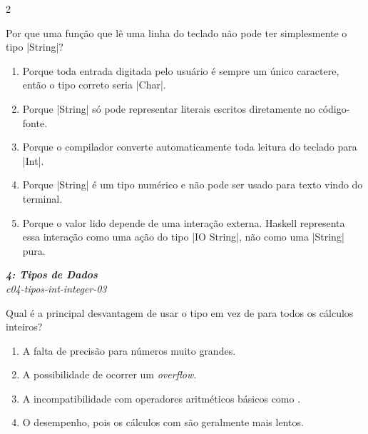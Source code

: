 \documentclass[a4paper,10pt,brazil]{article}
\begin{document}
\begin{multicols}{2}
\begin{flushright}
\end{flushright}
Por que uma função que lê uma linha do teclado não pode ter simplesmente o tipo \haskellinline|String|?

\begin{enumerate}
  \item Porque toda entrada digitada pelo usuário é sempre um único caractere, então o tipo correto seria \haskellinline|Char|.

  \item Porque \haskellinline|String| só pode representar literais escritos diretamente no código-fonte.

  \item Porque o compilador converte automaticamente toda leitura do teclado para \haskellinline|Int|.

  \item Porque \haskellinline|String| é um tipo numérico e não pode ser usado para texto vindo do terminal.

  \item Porque o valor lido depende de uma interação externa. Haskell representa essa interação como uma ação do tipo \haskellinline|IO String|, não como uma \haskellinline|String| pura.


\end{enumerate}

\begin{flushright}
  \footnotesize
  \textit{\textbf{4: Tipos de Dados}}\\
  \textit{c04-tipos-int-integer-03}\\

\end{flushright}
Qual é a principal desvantagem de usar o tipo  em vez de  para todos os cálculos inteiros?

\begin{enumerate}
  \item A falta de precisão para números muito grandes.

  \item A possibilidade de ocorrer um \emph{overflow}.

  \item A incompatibilidade com operadores aritméticos básicos como \haskellinline{+}.

  \item O desempenho, pois os cálculos com  são geralmente mais lentos.


\end{enumerate}
\end{multicols}
\end{document}
